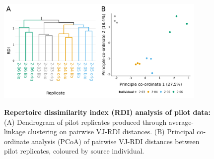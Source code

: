\begin{figure}
\centering
\includegraphics[width = 0.9\textwidth]{_Figures/png/pilot-rdi-vj-replicate}
\begin{subfigure}{0em}
\label{fig:igseq-pilot-rdi-dendrogram}
\end{subfigure}
\begin{subfigure}{0em}
\label{fig:igseq-pilot-rdi-pcoa}
\end{subfigure}
\caption[Repertoire dissimilarity index (RDI) analysis of pilot data]{\textbf{Repertoire dissimilarity index (RDI) analysis of pilot data:} (A) Dendrogram of pilot replicates produced through average-linkage clustering on pairwise VJ-RDI distances. (B) Principal co-ordinate analysis (PCoA) of pairwise VJ-RDI distances between pilot replicates, coloured by source individual.}
\label{fig:igseq-pilot-rdi}
\end{figure}

